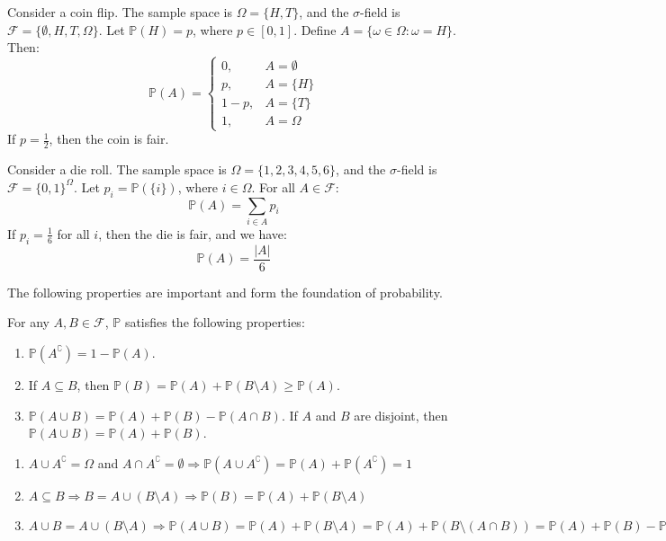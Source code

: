 \documentclass{huhtakm-template-book-v2}
\newcommand{\prob}{\mathbb{P}}
\begin{document}
    \begin{eg}
        Consider a coin flip. The sample space is $\Omega = \{H,T\}$, and the $\sigma$-field is $\mathcal{F} = \{\emptyset,H,T,\Omega\}$. Let $\prob(H) = p$, where $p \in [0,1]$. Define $A = \{\omega \in \Omega:\omega = H\}$. Then:
        \begin{equation*}
            \prob(A) = \begin{cases}
                0, &A = \emptyset\\
                p, &A = \{H\}\\
                1-p, &A = \{T\}\\
                1, &A = \Omega
            \end{cases}
        \end{equation*}
        If $p = \frac{1}{2}$, then the coin is fair.   
    \end{eg}
    \begin{eg}
        Consider a die roll. The sample space is $\Omega = \{1,2,3,4,5,6\}$, and the $\sigma$-field is $\mathcal{F} = \{0,1\}^{\Omega}$. Let $p_{i} = \prob(\{i\})$, where $i \in \Omega$. For all $A \in \mathcal{F}$:
        \begin{equation*}
            \prob(A) = \sum_{i \in A}p_{i}
        \end{equation*}
        If $p_{i} = \frac{1}{6}$ for all $i$, then the die is fair, and we have:
        \begin{equation*}
            \prob(A) = \frac{|A|}{6}
        \end{equation*}
    \end{eg}
    The following properties are important and form the foundation of probability.
    \begin{lem}
        For any $A,B \in \mathcal{F}$, $\prob$ satisfies the following properties:
        \begin{enumerate}
            \item $\prob(A^{\complement}) = 1-\prob(A)$.
            \item If $A\subseteq B$, then $\prob(B) = \prob(A)+\prob(B\setminus A) \geq \prob(A)$.
            \item $\prob(A\cup B) = \prob(A)+\prob(B)-\prob(A\cap B)$. If $A$ and $B$ are disjoint, then $\prob(A\cup B) = \prob(A)+\prob(B)$.
        \end{enumerate}
    \end{lem}
    \begin{proofing}
        \begin{enumerate}
            \item $A\cup A^{\complement} = \Omega$ and $A\cap A^{\complement} = \emptyset \Longrightarrow \prob(A\cup A^{\complement}) = \prob(A)+\prob(A^{\complement}) = 1$
            \item $A\subseteq B \Longrightarrow B = A\cup (B\setminus A) \Longrightarrow \prob(B) = \prob(A)+\prob(B\setminus A)$
            \item $A\cup B = A\cup (B\setminus A) \Longrightarrow \prob(A\cup B) = \prob(A)+\prob(B\setminus A) = \prob(A)+\prob(B\setminus(A\cap B)) = \prob(A)+\prob(B)-\prob(A\cap B)$
        \end{enumerate}
    \end{proofing}
\end{document}
